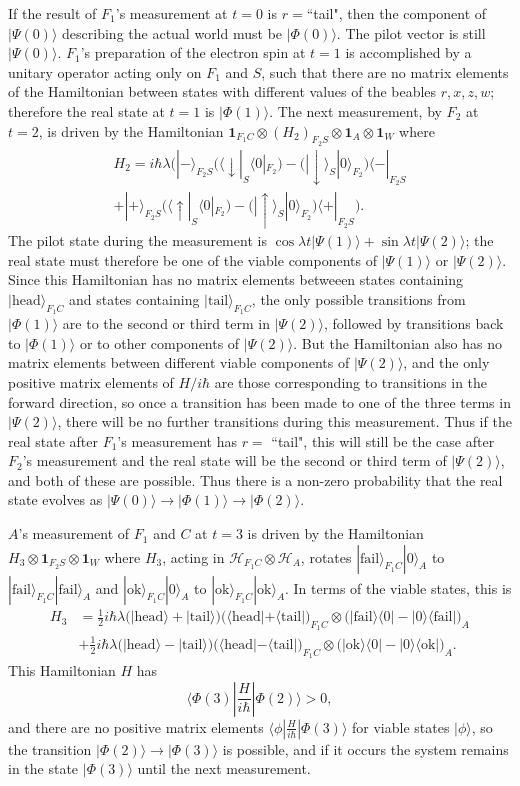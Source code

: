 \documentclass[12pt,reqno]{article}
\newcommand{\head}{\text{head}}
\newcommand{\tail}{\text{tail}}
\newcommand{\ok}{\text{ok}}
\newcommand{\fail}{\text{fail}}
\renewcommand{\(}{\left(}
\renewcommand{\)}{\right)}
\renewcommand{\.}{\centerdot}
\newcommand{\1}{\mathbf{1}}
\newcommand{\ox}{\otimes}
\newcommand{\<}{\langle}
\renewcommand{\>}{\rangle}
\newcommand{\half}{\tfrac{1}{2}}
\renewcommand{\H}{\mathcal{H}}
\theoremstyle{definition}
\theoremstyle{remark}
\numberwithin{equation}{section}
\begin{document}
 If the result of $F_1$'s measurement at $t = 0$ is $r = $``tail", then the component of $|\Psi(0)\>$ describing the actual world must be $|\Phi(0)\>$. 
The pilot vector is still $|\Psi(0)\>$. $F_1$'s preparation of the electron spin at $t=1$ is accomplished by a unitary operator acting only on $F_1$ and $S$, such that there are no matrix elements of the Hamiltonian between states with different values of the beables $r,x,z,w$; therefore the real state at $t=1$ is $|\Phi(1)\>$. The next measurement, by $F_2$ at $t = 2$, is driven by the Hamiltonian $\1_{F_1C}\ox (H_2)_{F_2S}\ox\1_A\ox \1_W$ where
\begin{multline}
H_2 = i\hbar\lambda\Big(|-\>_{F_2S}\big(\<\downarrow|_S\<0|_{F_2}\big) - \big(|\downarrow\>_S|0\>_{F_2}\big)\<-|_{F_2S}\\
 + |+\>_{F_2S}\big(\<\uparrow|_S\<0|_{F_2}\big) - \big(|\uparrow\>_S|0\>_{F_2}\big)\<+|_{F_2S}\Big).
\end{multline}
The pilot state during the measurement is $\cos\lambda t|\Psi(1)\> + \sin\lambda t|\Psi(2)\>$; the real state must therefore be one of the viable components of $|\Psi(1)\>$ or $|\Psi(2)\>$. Since this Hamiltonian has no matrix elements betweeen states containing $|\head\>_{F_1C}$ and states containing $|\tail\>_{F_1C}$, the only possible transitions from $|\Phi(1)\>$ are to the second or third term in $|\Psi(2)\>$, followed by transitions back to $|\Phi(1)\>$ or to other components of $|\Psi(2)\>$. But the Hamiltonian also has no matrix elements between different viable components of $|\Psi(2)\>$, and the only positive matrix elements of $H/i\hbar$ are those corresponding to transitions in the forward direction, so once a transition has been made to one of the three terms in $|\Psi(2)\>$, there will be no further transitions during this measurement. Thus if the real state after $F_1$'s measurement has $r = $ ``tail", this will still be the case after $F_2$'s measurement and the real state will be the second or third term of $|\Psi(2)\>$, and both of these are possible. Thus there is a non-zero probability that the real state evolves as $|\Psi(0)\> \rightarrow |\Phi(1)\> \rightarrow |\Phi(2)\>$. 

$A$'s measurement of $F_1$ and $C$ at $t = 3$ is driven by the Hamiltonian
$H_3\ox\1_{F_2S}\ox\1_W$ where $H_3$, acting in $\H_{F_1C}\ox\H_A$, rotates $|\fail\>_{F_1C}|0\>_A$ to $|\fail\>_{F_1C}|\fail\>_A$ and $|\ok\>_{F_1C}|0\>_A$ to $|\ok\>_{F_1C}|\ok\>_A$. In terms of the viable states, this is 
\begin{align*}
H_3 &= \half i\hbar\lambda\big(|\head\> + |\tail\>\big)\big(\<\head| + \<\tail|\big)_{F_1C}\ox\big(|\fail\>\<0| - |0\>\<\fail|\big)_A\\
&+ \half i\hbar\lambda\big(|\head\> - |\tail\>\big)\big(\<\head| - \<\tail|\big)_{F_1C}\ox\big(|\ok\>\<0| - |0\>\<\ok|\big)_A.
\end{align*}
This Hamiltonian $H$ has 
\[
\<\Phi(3)|\frac{H}{i\hbar}|\Phi(2)\> > 0,
\]
and there are no positive matrix elements $\<\phi|\tfrac{H}{i\hbar}|\Phi(3)\>$ for viable states $|\phi\>$, so the transition $|\Phi(2)\> \rightarrow |\Phi(3)\>$ is possible, and if it occurs the system remains in the state $|\Phi(3)\>$ until the next measurement.
 
\end{document}
